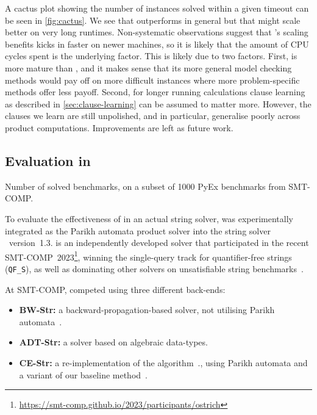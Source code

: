 A cactus plot showing the number of instances solved within a given timeout can
be seen in \cref{fig:cactus}. We see that \Calculus{} outperforms \Nuxmv{} in
general but that \Nuxmv{} might scale better on very long runtimes.
Non-systematic observations suggest that \Nuxmv{}'s scaling benefits kicks in
faster on newer machines, so it is likely that the amount of CPU cycles spent is
the underlying factor. This is likely due to two factors. First, \Nuxmv{} is
more mature than \Calculus{}, and it makes sense that its more general model
checking methods would pay off on more difficult instances where more
problem-specific methods offer less payoff. Second, for longer running
calculations clause learning as described in \cref{sec:clause-learning} can be
assumed to matter more. However, the clauses we learn are still unpolished, and
in particular, generalise poorly across product computations. Improvements are
left as future work.

\subsection{Evaluation in \Ostrich{}}\label{}%

\begin{table}
  \begin{center}
  
  \end{center}
  \caption{Number of solved benchmarks, on a subset of 1000
    PyEx benchmarks from SMT-COMP.}\label{tab:solve-status-smt-comp}
\end{table}

To evaluate the effectiveness of \Calculus{} in an actual string solver,
\Catra{} was experimentally integrated as the Parikh automata product solver
into the string solver \Ostrich{}~version~1.3. \Ostrich{} is an independently
developed solver that participated in the recent SMT-COMP~2023\footnote{\url{https://smt-comp.github.io/2023/participants/ostrich}},
 winning the single-query track
for quantifier-free strings (\texttt{QF\_S}), as well as dominating
other solvers on unsatisfiable string benchmarks~\cite{smt-comp-23}.

At SMT-COMP, \Ostrich{} competed using three different back-ends:
\begin{itemize}
\item \textbf{BW-Str:} a backward-propagation-based solver, not utilising
  Parikh automata~\cite{ostrich}.
\item \textbf{ADT-Str:} a solver based on algebraic data-types.
\item \textbf{CE-Str:} a re-implementation of the \OstrichPlus{}
  algorithm~\cite{ostrichplus}., using Parikh automata and a variant
  of our baseline method~\cite{generate-parikh-image}.
\end{itemize}

